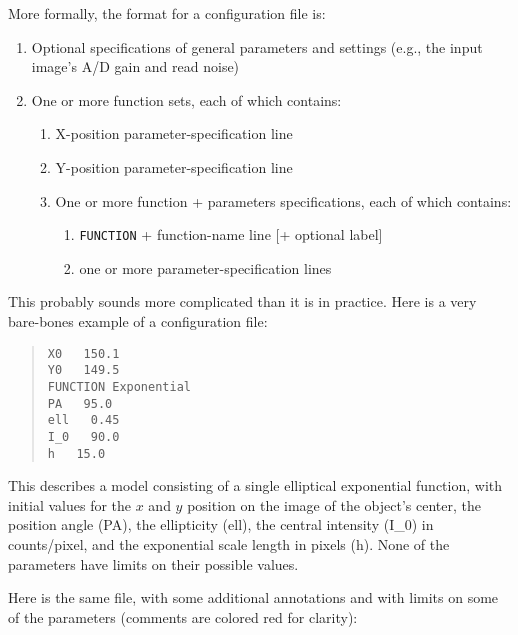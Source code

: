 \documentclass[10pt,a4paper,article]{memoir}
\begin{document}
More formally, the format for a configuration file is:
\begin{enumerate}
\item Optional specifications of general parameters and settings (e.g., the
input image's A/D gain and read noise)
\item One or more function sets, each of which contains:
\begin{enumerate}
\item X-position parameter-specification line
\item Y-position parameter-specification line
\item One or more function + parameters specifications, each of which contains:
\begin{enumerate}
\item \texttt{FUNCTION} + function-name line [+ optional label]
\item one or more parameter-specification lines
\end{enumerate}
\end{enumerate}
\end{enumerate}

This probably sounds more complicated than it is in practice.
Here is a very bare-bones example of a configuration file:

\begin{quote}
  \texttt{X0  ~  150.1}\\
  \texttt{Y0  ~  149.5}\\
  \texttt{FUNCTION   Exponential}\\
  \texttt{PA  ~  95.0}\\
  \texttt{ell  ~  0.45}\\
  \texttt{I\_0 ~  90.0}\\
  \texttt{h   ~  15.0}\\
\end{quote}

This describes a model consisting of a single elliptical exponential
function, with initial values for the $x$ and $y$ position on the image
of the object's center, the position angle (PA), the ellipticity (ell),
the central intensity (I\_0) in counts/pixel, and the exponential scale
length in pixels (h). None of the parameters have limits on their
possible values.

Here is the same file, with some additional annotations and with limits on
some of the parameters (comments are colored red for clarity):
\end{document}
